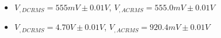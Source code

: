 \begin{itemize}
     \item $V_{, DCRMS}=555mV\pm 0.01\unit{V}$, $V_{, ACRMS}=555.0mV\pm 0.01\unit{V}$ 
     \item $V_{, DCRMS}=4.70V\pm 0.01\unit{V}$, $V_{, ACRMS}=920.4mV\pm 0.01\unit{V}$\\
\end{itemize}